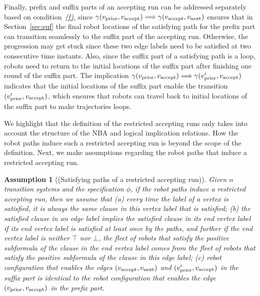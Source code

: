 \documentclass[Afour,sageh,times]{sagej}
\newtheorem{asmp}[thm]{Assumption}
\newcommand{\autop}{\ccalA_{\phi}}
\newcommand{\vertex}[1]{v_{\textup{#1}}}
\newcommand{\simplies}{\DOTSB\Longrightarrow}
\begin{document}
      Finally, prefix and suffix parts of an accepting run can be addressed separately based on condition~\hyperref[cond:f]{\it (f)}, since  $\gamma(\vertex{prior}, \vertex{accept}) \simplies  \gamma(\vertex{accept}, \vertex{next})$  ensures that in Section~\ref{sec:suf} the final robot locations of the satisfying path for  the prefix part can transition seamlessly to the suffix part of the accepting run. Otherwise, the progression may get stuck since these two edge labels need to be satisfied at two consecutive time instants. Also, since the suffix part of a satisfying path is a loop, robots need to return to the initial locations of the suffix part after finishing one round of the suffix part. The implication $\gamma(\vertex{prior}, \vertex{accept}) \simplies  \gamma(\vertex{prior}', \vertex{accept})$ indicates that the initial locations of the suffix part enable the transition  $(\vertex{prior}', \vertex{accept})$, which ensures that robots can travel back to initial locations of the suffix part  to make trajectories loops. %



We highlight that the definition of the restricted  accepting runs only takes into account the structure of the  NBA and logical implication relations. How the robot paths induce such a restricted accepting run  is beyond the scope of the definition. Next, we make assumptions regarding the robot paths that induce a restricted accepting run.
\begin{asmp}[(Satisfying paths of a restricted accepting run)]\label{asmp:same}
  Given $n$ transition systems and the specification $\phi$, if the robot paths induce a restricted accepting run, then we assume that
  (a)\label{asmp:a} every time the label of a vertex is satisfied, it is always the same clause in this vertex label that is satisfied; (b)\label{asmp:b} the satisfied clause in an edge label implies the satisfied clause in its end vertex label if its end vertex label is satisfied at least once by the paths, and further if the end vertex label is neither $\top$ nor $\bot$, %
  the fleet of robots that satisfy the positive subformula of the clause in the end vertex label comes from the fleet of robots that satisfy the positive   subformula of the clause in this edge label;
  (c)\label{asmp:c} robot configuration that enables the edges $(\vertex{accept}, \vertex{next})$ and  $(\vertex{prior}', \vertex{accept})$ in the suffix part is identical to the  robot configuration that enables the edge $(\vertex{prior}, \vertex{accept})$ in the prefix part.
\end{asmp}
\end{document}
